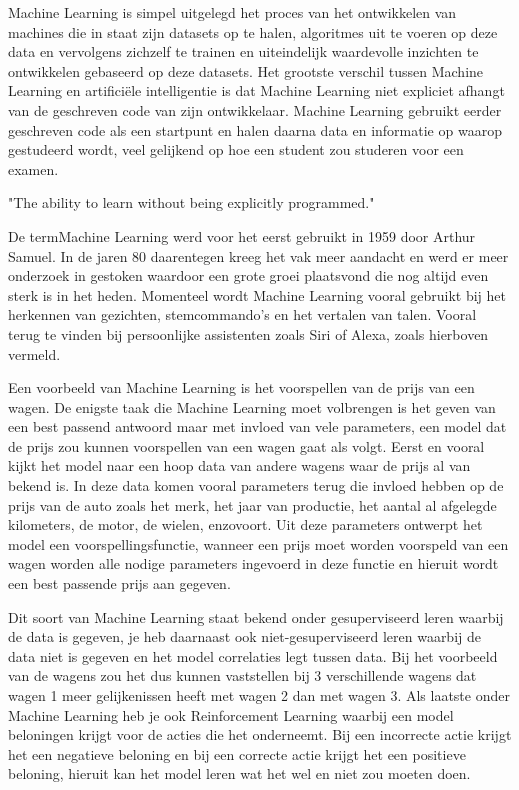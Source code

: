 Machine Learning is simpel uitgelegd het proces van het ontwikkelen van machines die in staat zijn datasets op te halen, algoritmes uit te voeren op deze data en vervolgens zichzelf te trainen en uiteindelijk waardevolle inzichten te ontwikkelen gebaseerd op deze datasets.
Het grootste verschil tussen Machine Learning en artificiële intelligentie is dat Machine Learning niet expliciet afhangt van de geschreven code van zijn ontwikkelaar. Machine Learning gebruikt eerder geschreven code als een startpunt en halen daarna data en informatie op waarop gestudeerd wordt, veel gelijkend op hoe een student zou studeren voor een examen.

\autocite{Arthur Samuel, 1959} "The ability to learn without being explicitly programmed."

De termMachine Learning werd voor het eerst gebruikt in 1959 door Arthur Samuel. In de jaren 80 daarentegen kreeg het vak meer aandacht en werd er meer onderzoek in gestoken waardoor een grote groei plaatsvond die nog altijd even sterk is in het heden. \autocite{KeithD.2019} 
Momenteel wordt Machine Learning vooral gebruikt bij het herkennen van gezichten, stemcommando's en het vertalen van talen. Vooral terug te vinden bij persoonlijke assistenten zoals Siri of Alexa, zoals hierboven vermeld.

Een voorbeeld van Machine Learning is het voorspellen van de prijs van een wagen.
De enigste taak die Machine Learning moet volbrengen is het geven van een best passend antwoord maar met invloed van vele parameters, een model dat de prijs zou kunnen voorspellen van een wagen gaat als volgt.
Eerst en vooral kijkt het model naar een hoop data van andere wagens waar de prijs al van bekend is. 
In deze data komen vooral parameters terug die invloed hebben op de prijs van de auto zoals het merk, het jaar van productie, het aantal al afgelegde kilometers, de motor, de wielen, enzovoort. 
Uit deze parameters ontwerpt het model een voorspellingsfunctie, wanneer een prijs moet worden voorspeld van een wagen worden alle nodige parameters ingevoerd in deze functie en hieruit wordt een best passende prijs aan gegeven.

Dit soort van Machine Learning staat bekend onder gesuperviseerd leren waarbij de data is gegeven, je heb daarnaast ook niet-gesuperviseerd leren waarbij de data niet is gegeven en het model correlaties legt tussen data.
Bij het voorbeeld van de wagens zou het dus kunnen vaststellen bij 3 verschillende wagens dat wagen 1 meer gelijkenissen heeft met wagen 2 dan met wagen 3.
Als laatste onder Machine Learning heb je ook Reinforcement Learning waarbij een model beloningen krijgt voor de acties die het onderneemt. Bij een incorrecte actie krijgt het een negatieve beloning en bij een correcte actie krijgt het een positieve beloning, hieruit kan het model leren wat het wel en niet zou moeten doen.

